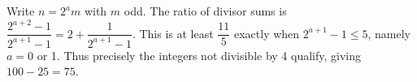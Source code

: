 Write $n=2^a m$ with $m$ odd. The ratio of divisor sums is $\dfrac{2^{a+2}-1}{2^{a+1}-1}=2+\dfrac{1}{2^{a+1}-1}$. This is at least $\dfrac{11}{5}$ exactly when $2^{a+1}-1\le5$, namely $a=0$ or 1. Thus precisely the integers not divisible by 4 qualify, giving $100-25=\boxed{75}$.
